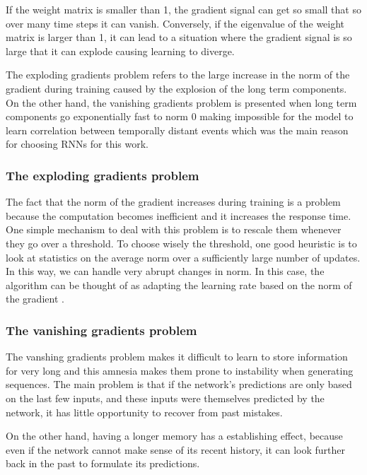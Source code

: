 If the  weight matrix is smaller than 1, the gradient signal can get so small that so over many time steps it can vanish. Conversely, if the eigenvalue of the weight matrix is larger than 1, it can lead to a situation where the gradient signal is so large that it can explode causing learning to diverge. 

The exploding gradients problem refers to the large increase in the norm of the gradient during training caused by the explosion of the long term components. On the other hand, the vanishing gradients problem is presented when long term components go exponentially fast to norm 0 making impossible for the model to learn correlation between temporally distant events \cite{pascanu2013difficulty} which was the main reason for choosing RNNs for this work. 

\subsubsection*{The exploding gradients problem}
 The fact that the norm of the gradient increases during training is a problem because the computation becomes inefficient and it increases the response time. One simple mechanism to deal with this problem is to rescale them whenever they go over a threshold. To choose wisely the threshold, one good heuristic is to look at statistics on the average norm over a sufficiently large number of updates. In this way, we can handle very abrupt changes in norm. In this case, the algorithm can be thought of as adapting the learning rate based on the norm of the gradient  \cite{pascanu2013difficulty}.

\subsubsection*{The vanishing gradients problem}

The vanshing gradients problem makes it difficult to learn to store information for very long and this amnesia makes them prone to instability when generating sequences. The main problem is that if the network's predictions  are only based on the last few inputs, and these inputs were themselves predicted by the network, it has little opportunity to recover from past mistakes.

On the other hand, having a longer memory has a establishing effect, because even if the network cannot make sense of its recent history, it can look further back in the past to formulate its predictions. \cite{graves2013generating}

